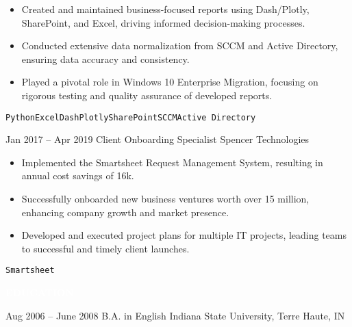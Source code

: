\documentclass[9pt]{developercv} %
\renewcommand{\cvsect}[1]{%
    \vspace{\baselineskip} %
    \colorbox{primary}{\textcolor{white}{\MakeUppercase{\textbf{#1}}}}\\%
}
\begin{document}
\begin{entrylist}
{\begin{itemize}
            \item Created and maintained business-focused reports using Dash/Plotly, SharePoint, and Excel, driving informed decision-making processes.
            \item Conducted extensive data normalization from SCCM and Active Directory, ensuring data accuracy and consistency.
            \item Played a pivotal role in Windows 10 Enterprise Migration, focusing on rigorous testing and quality assurance of developed reports.
        \end{itemize}
        \texttt{Python}\slashsep\texttt{Excel}\slashsep\texttt{Dash}\slashsep\texttt{Plotly}\slashsep\texttt{SharePoint}\slashsep\texttt{SCCM}\slashsep\texttt{Active Directory}
        }
    \entry
        {Jan 2017 -- Apr 2019}
        { Client Onboarding Specialist}
        {Spencer Technologies}
        {
        \begin{itemize}
            \item Implemented the Smartsheet Request Management System, resulting in annual cost savings of 16k.
            \item Successfully onboarded new business ventures worth over 15 million, enhancing company growth and market presence.
            \item Developed and executed project plans for multiple IT projects, leading teams to successful and timely client launches.
        \end{itemize}
        \texttt{Smartsheet}
        }
\end{entrylist}


\cvsect{Education}

\begin{entrylist}
    \entry
        {Aug 2006 -- June 2008}
        { B.A. in English}
        {Indiana State University, Terre Haute, IN}
        {}
\end{entrylist}

\end{document}
